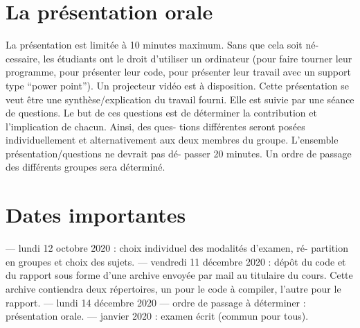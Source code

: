 \documentclass[a4paper, 11pt, oneside]{article}
\begin{document}
\section{\textbf{La présentation orale}}
La présentation est limitée à 10 minutes maximum. Sans que cela soit né-
cessaire, les étudiants ont le droit d’utiliser un ordinateur (pour faire tourner
leur programme, pour présenter leur code, pour présenter leur travail avec
un support type “power point”). Un projecteur vidéo est à disposition. Cette
présentation se veut être une synthèse/explication du travail fourni.
Elle est suivie par une séance de questions. Le but de ces questions est
de déterminer la contribution et l’implication de chacun. Ainsi, des ques-
tions différentes seront posées individuellement et alternativement aux deux
membres du groupe. L’ensemble présentation/questions ne devrait pas dé-
passer 20 minutes. Un ordre de passage des différents groupes sera déterminé.

\section{\textbf{Dates importantes}}
— lundi 12 octobre 2020 : choix individuel des modalités d’examen, ré-
partition en groupes et choix des sujets.
— vendredi 11 décembre 2020 : dépôt du code et du rapport sous forme
d’une archive envoyée par mail au titulaire du cours. Cette archive
contiendra deux répertoires, un pour le code à compiler, l’autre pour
le rapport.
— lundi 14 décembre 2020 — ordre de passage à déterminer : présentation
orale.
— janvier 2020 : examen écrit (commun pour tous).
\end{document}
